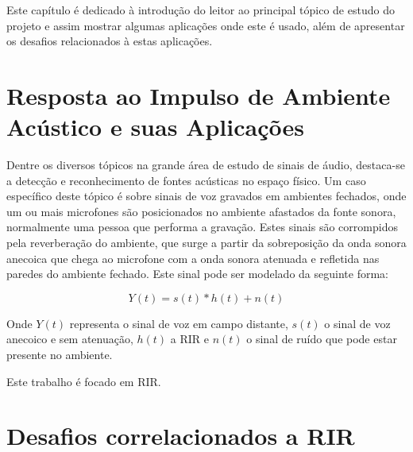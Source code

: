 Este capítulo é dedicado à introdução do leitor ao principal tópico de estudo do projeto e assim mostrar
algumas aplicações onde este é usado, além de apresentar os desafios relacionados à estas aplicações.

\section{Resposta ao Impulso de Ambiente Acústico e suas Aplicações}

Dentre os diversos tópicos na grande área de estudo de sinais de áudio, destaca-se a detecção e reconhecimento de fontes acústicas no espaço físico.
Um caso específico deste tópico é sobre sinais de voz gravados em ambientes fechados, onde um ou mais microfones são posicionados no ambiente afastados
da fonte sonora, normalmente uma pessoa que performa a gravação.
Estes sinais são corrompidos pela reverberação do ambiente, que surge a partir da sobreposição da onda sonora anecoica que chega ao microfone com a 
onda sonora atenuada e refletida nas paredes do ambiente fechado.
Este sinal pode ser modelado da seguinte forma:

\begin{equation}
    Y(t) = s(t) \ast h(t) + n(t)
\end{equation}

Onde $Y(t)$ representa o sinal de voz em campo distante, $s(t)$ o sinal de voz anecoico e sem atenuação, $h(t)$ a RIR e $n(t)$ o sinal de ruído que pode
estar presente no ambiente.

Este trabalho é focado em RIR. 



\section{Desafios correlacionados a RIR}